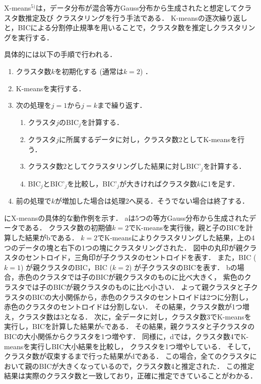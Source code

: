 X-means$^{5)}$は，データ分布が混合等方Gauss分布から生成されたと想定してクラスタ数推定及び
クラスタリングを行う手法である．
K-meansの逐次繰り返しと，BICによる分割停止規準を用いることで，クラスタ数を推定しクラスタリングを実行する．

具体的には以下の手順で行われる．
\begin{enumerate}
    \item クラスタ数$k$を初期化する (通常は$k=2$) ．
    \item K-meansを実行する．
    \item 次の処理を$j=1$から$j=k$まで繰り返す．
    \begin{enumerate}
        \item クラスタ$j$のBIC$_j$を計算する．
        \item クラスタ$j$に所属するデータに対し，クラスタ数2としてK-meansを行う．
        \item クラスタ数2としてクラスタリングした結果に対しBIC'$_j$を計算する．
        \item BIC$_j$とBIC'$_j$を比較し，BIC'$_j$が大きければクラスタ数$k$に1を足す．
    \end{enumerate}
    \item 前の処理で$k$が増加した場合は処理2へ戻る．そうでない場合は終了する．
\end{enumerate}

にX-meansの具体的な動作例を示す．
aは5つの等方Gauss分布から生成されたデータである．
クラスタ数の初期値$k=2$でK-meansを実行後，親と子のBICを計算した結果がbである．
$k=2$でK-meansによりクラスタリングした結果，上の4つのデータの塊と右下の1つの塊にクラスタリングされた．
図中の丸印が親クラスタのセントロイド，三角印が子クラスタのセントロイドを表す．
また，BIC ($k=1$) が親クラスタのBIC，BIC ($k=2$) が子クラスタのBICを表す．
bの場合，赤色のクラスタでは子のBICが親クラスタのものに比べ大きく，
紫色のクラスタでは子のBICが親クラスタのものに比べ小さい．
よって親クラスタと子クラスタのBICの大小関係から，赤色のクラスタのセントロイドは2つに分割し，
赤色のクラスタのセントロイドは分割しない．
その結果，クラスタ数が1つ増え，クラスタ数は3となる．
次に，全データに対し，クラスタ数3でK-meansを実行し，BICを計算した結果がcである．
その結果，親クラスタと子クラスタのBICの大小関係からクラスタを1つ増やす．
同様に，dでは，クラスタ数4でK-meansを実行しBIC大小結果を比較し，
クラスタを1つ増やしている．
そして，クラスタ数が収束するまで行った結果がdである．
この場合，全てのクラスタにおいて親のBICが大きくなっているので，クラスタ数4と推定された．
この推定結果は実際のクラスタ数と一致しており，正確に推定できていることがわかる．

